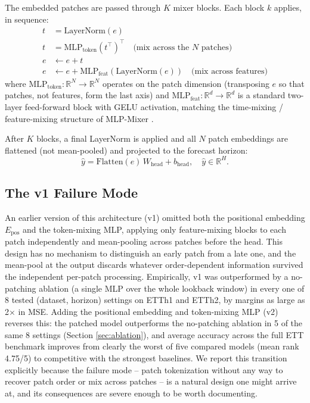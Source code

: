 \documentclass[conference]{IEEEtran}
\begin{document}
The embedded patches are passed through $K$ mixer blocks. Each block $k$ applies,
in sequence:
\begin{align}
t &= \text{LayerNorm}(e) \\
t &= \text{MLP}_{\text{token}}(t^\top)^\top \quad \text{(mix across the $N$ patches)} \\
e &\leftarrow e + t \\
e &\leftarrow e + \text{MLP}_{\text{feat}}(\text{LayerNorm}(e)) \quad \text{(mix across features)}
\end{align}
where $\text{MLP}_{\text{token}}: \mathbb{R}^{N} \to \mathbb{R}^{N}$ operates on the
patch dimension (transposing $e$ so that patches, not features, form the last axis)
and $\text{MLP}_{\text{feat}}: \mathbb{R}^{d} \to \mathbb{R}^{d}$ is a standard
two-layer feed-forward block with GELU activation, matching the time-mixing /
feature-mixing structure of MLP-Mixer \cite{tolstikhin2021mlpmixer}.

After $K$ blocks, a final LayerNorm is applied and all $N$ patch embeddings are
flattened (not mean-pooled) and projected to the forecast horizon:
\begin{equation}
\hat{y} = \text{Flatten}(e) \, W_{\text{head}} + b_{\text{head}}, \quad
\hat{y} \in \mathbb{R}^{H}.
\end{equation}

\subsection{The v1 Failure Mode}

An earlier version of this architecture (v1) omitted both the positional embedding
$E_{\text{pos}}$ and the token-mixing MLP, applying only feature-mixing blocks to
each patch independently and mean-pooling across patches before the head. This
design has no mechanism to distinguish an early patch from a late one, and the
mean-pool at the output discards whatever order-dependent information survived
the independent per-patch processing. Empirically, v1 was outperformed by a
no-patching ablation (a single MLP over the whole lookback window) in every one of
8 tested (dataset, horizon) settings on ETTh1 and ETTh2, by margins as large as
2$\times$ in MSE. Adding the positional embedding and token-mixing MLP (v2) reverses
this: the patched model outperforms the no-patching ablation in 5 of the same 8
settings (Section \ref{sec:ablation}), and average accuracy across the full ETT
benchmark improves from clearly the worst of five compared models (mean rank
4.75/5) to competitive with the strongest baselines. We report this transition
explicitly because the failure mode -- patch tokenization without any way to
recover patch order or mix across patches -- is a natural design one might arrive
at, and its consequences are severe enough to be worth documenting.
\end{document}
